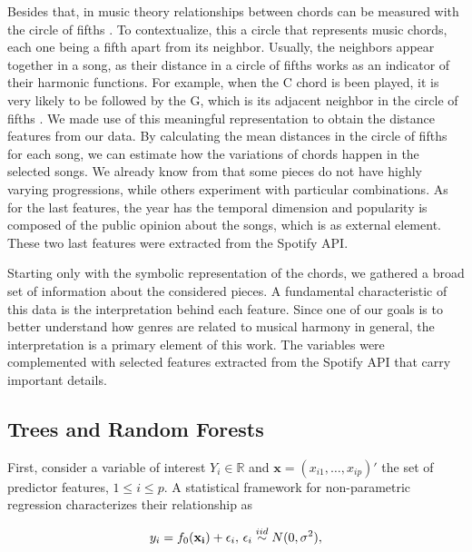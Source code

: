 \documentclass[twocolumn]{article}
\begin{document}
Besides that, in music theory
relationships between chords can be measured with the
circle of fifths \cite{Lewin1982}. 
To contextualize, this a circle that 
represents music chords, each one being  
a fifth apart from its neighbor. Usually, the 
neighbors appear together in a song,
as their distance in a circle of fifths
works as an indicator of their
harmonic functions. For example, 
when the C chord is been played, it is
very likely to be followed by the G, which
is its adjacent neighbor in the circle
of fifths \cite{Lerdahl1977}. We made use of 
this meaningful representation to obtain the 
distance features from our data. By calculating the
mean distances in the circle of fifths for each 
song, we can estimate how the variations of 
chords happen in the selected songs.
We already know from  \cite{Absolu2010}
that some pieces do not have highly varying
progressions, while others experiment with 
particular combinations. As for the last features, 
the year has the temporal dimension and popularity 
is composed of the public opinion about the songs,
which is as external element. These
two last features were extracted from the Spotify API. 

Starting only with the 
symbolic representation of the chords, we gathered
a broad set of information about the considered pieces.
A fundamental characteristic
of this data is the interpretation behind each feature.
Since one of our goals is to better understand how
genres are related to musical harmony in general, 
the interpretation is a primary element of this work. 
The variables were complemented with selected
features extracted from the Spotify API that carry important details. 

\subsection{Trees and Random Forests}

First, consider a variable of interest $Y_i \in \mathbb{R}$ 
and $\mathbf{x} = (x_{i1},\dots, x_{ip})'$ the set 
of predictor features, $1 \leq i \leq p$. A statistical
framework for non-parametric regression characterizes
their relationship as 

\begin{equation}
y_i = f_0(\mathbf{x_i}) + \epsilon_i, \thinspace
\epsilon_i \stackrel{iid}\sim N(0, \sigma^2),
\end{equation}
\end{document}

